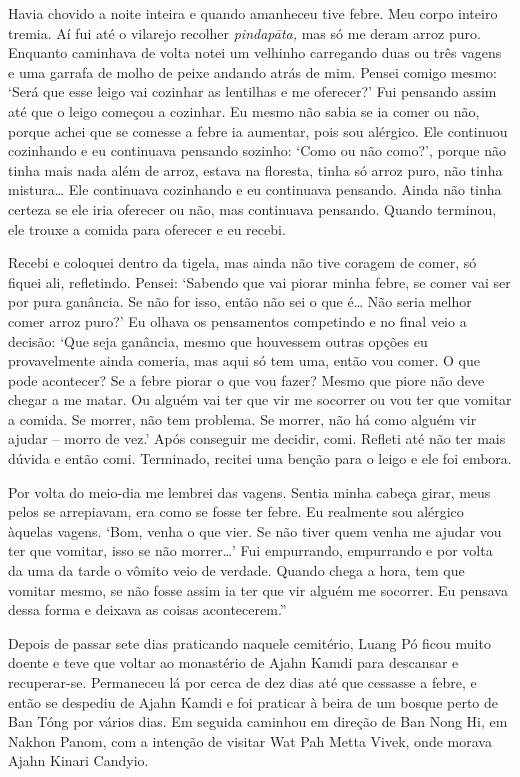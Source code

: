 Havia chovido a noite inteira e quando amanheceu tive febre. Meu corpo
inteiro tremia. Aí fui até o vilarejo recolher \emph{pindapāta,} mas só
me deram arroz puro. Enquanto caminhava de volta notei um velhinho
carregando duas ou três vagens e uma garrafa de molho de peixe andando
atrás de mim. Pensei comigo mesmo: `Será que esse leigo vai cozinhar as
lentilhas e me oferecer?' Fui pensando assim até que o leigo começou a
cozinhar. Eu mesmo não sabia se ia comer ou não, porque achei que se
comesse a febre ia aumentar, pois sou alérgico. Ele continuou cozinhando
e eu continuava pensando sozinho: `Como ou não como?', porque não tinha
mais nada além de arroz, estava na floresta, tinha só arroz puro, não
tinha mistura\ldots{} Ele continuava cozinhando e eu continuava
pensando. Ainda não tinha certeza se ele iria oferecer ou não, mas
continuava pensando. Quando terminou, ele trouxe a comida para oferecer
e eu recebi.

Recebi e coloquei dentro da tigela, mas ainda não tive coragem de comer,
só fiquei ali, refletindo. Pensei: `Sabendo que vai piorar minha febre,
se comer vai ser por pura ganância. Se não for isso, então não sei o que
é\ldots{} Não seria melhor comer arroz puro?' Eu olhava os pensamentos
competindo e no final veio a decisão: `Que seja ganância, mesmo que
houvessem outras opções eu provavelmente ainda comeria, mas aqui só tem
uma, então vou comer. O que pode acontecer? Se a febre piorar o que vou
fazer? Mesmo que piore não deve chegar a me matar. Ou alguém vai ter que
vir me socorrer ou vou ter que vomitar a comida. Se morrer, não tem
problema. Se morrer, não há como alguém vir ajudar -- morro de vez.'
Após conseguir me decidir, comi. Refleti até não ter mais dúvida e então
comi. Terminado, recitei uma benção para o leigo e ele foi embora.

Por volta do meio-dia me lembrei das vagens. Sentia minha cabeça girar,
meus pelos se arrepiavam, era como se fosse ter febre. Eu realmente sou
alérgico àquelas vagens. `Bom, venha o que vier. Se não tiver quem venha
me ajudar vou ter que vomitar, isso se não morrer\ldots{}' Fui
empurrando, empurrando e por volta da uma da tarde o vômito veio de
verdade. Quando chega a hora, tem que vomitar mesmo, se não fosse assim
ia ter que vir alguém me socorrer. Eu pensava dessa forma e deixava as
coisas acontecerem.''

Depois de passar sete dias praticando naquele cemitério, Luang Pó
ficou muito doente e teve que voltar ao monastério de Ajahn Kamdi para
descansar e recuperar-se. Permaneceu lá por cerca de dez dias até que
cessasse a febre, e então se despediu de Ajahn Kamdi e foi praticar à
beira de um bosque perto de Ban Tóng por vários dias. Em seguida
caminhou em direção de Ban Nong Hi, em Nakhon Panom, com a intenção de
visitar Wat Pah Metta Vivek, onde morava Ajahn Kinari Candyio.
